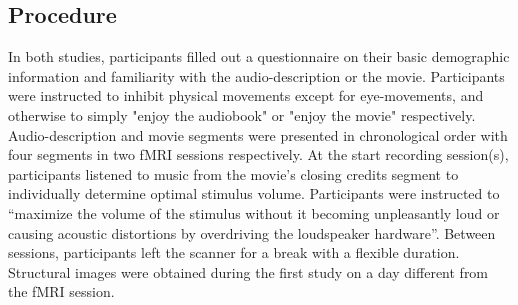 \documentclass[english]{article}
\begin{document}
\subsection{Procedure}
In both studies, participants filled out a questionnaire on their basic demographic information and familiarity with the audio-description or the movie.
Participants were instructed to inhibit physical movements except for eye-movements, and otherwise to simply "enjoy the audiobook" or "enjoy the movie" respectively.
Audio-description and movie segments were presented in chronological order with four segments in two fMRI sessions respectively.
 At the start recording session(s), participants listened to music from the movie’s closing credits segment to individually determine optimal stimulus volume. Participants were instructed to ``maximize the volume of the stimulus without it becoming unpleasantly loud or causing acoustic distortions by overdriving the loudspeaker hardware''.
Between sessions, participants left the scanner for a break with a flexible duration. Structural images were obtained during the first study on a day different from the fMRI session.
\end{document}
